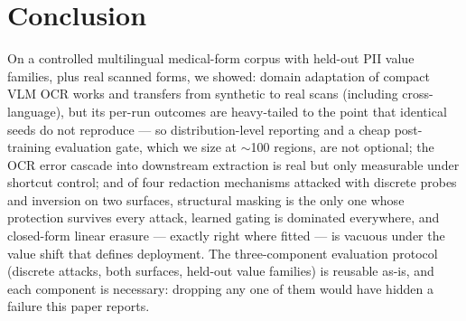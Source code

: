 \documentclass[11pt]{article}
\begin{document}
\section{Conclusion}

On a controlled multilingual medical-form corpus with held-out PII value
families, plus real scanned forms, we showed: domain adaptation of compact
VLM OCR works and transfers from synthetic to real scans (including
cross-language), but its per-run outcomes are heavy-tailed to the point that
identical seeds do not reproduce --- so distribution-level reporting and a
cheap post-training evaluation gate, which we size at $\sim$100 regions, are
not optional; the OCR error cascade into downstream extraction is real but
only measurable under shortcut control; and of four redaction mechanisms
attacked with discrete probes and inversion on two surfaces, structural
masking is the only one whose protection survives every attack, learned
gating is dominated everywhere, and closed-form linear erasure --- exactly
right where fitted --- is vacuous under the value shift that defines
deployment. The three-component evaluation protocol (discrete attacks, both
surfaces, held-out value families) is reusable as-is, and each component is
necessary: dropping any one of them would have hidden a failure this paper
reports.



\end{document}
